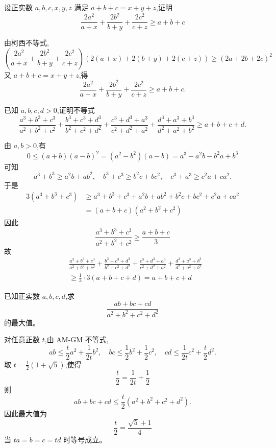 \begin{questions}
    \question 设正实数 $a,b,c,x,y,z$ 满足 $a+b+c = x+y+z$,证明
    \[
    \frac{2a^2}{a+x} + \frac{2b^2}{b+y} + \frac{2c^2}{c+z} \ge a+b+c
    \]
    \begin{solution}
    由柯西不等式,
        \[
        \left(\frac{2a^2}{a+x} + \frac{2b^2}{b+y} + \frac{2c^2}{c+z}\right)\left(2(a+x) +2(b+y) +2(c+z) \right) \ge (2a+2b+2c)^2 
        \]
        又 $a+b+c = x+y+z$,得
        \[
        \frac{2a^2}{a+x} + \frac{2b^2}{b+y} + \frac{2c^2}{c+z} \ge a+b+c.
        \]
    \end{solution}

    \question 已知 $a,b,c,d>0$,证明不等式
    \[
    \frac{a^{3}+b^{3}+c^{3}}{a^{2}+b^{2}+c^{2}}+\frac{b^{3}+c^{3}+d^{3}}{b^{2}+c^{2}+d^{2}}+\frac{c^{3}+d^{3}+a^{3}}{c^{2}+d^{2}+a^{2}}+\frac{d^{3}+a^{3}+b^{3}}{d^{2}+a^{2}+b^{2}}\ge a+b+c+d.
    \]
    \begin{solution}
        由 $a,b>0$,有
        \[
        0\le (a+b)(a-b)^2= (a^2-b^2)(a-b) = a^3 - a^2 b - b^2 a + b^3 
        \]
        可知
        \[
        a^3 + b^3 \ge a^2 b + a b^2, \quad b^3 + c^3 \ge b^2 c + b c^2, \quad c^3 + a^3 \ge c^2 a + c a^2.
        \]
        于是
        \begin{align*}
        3(a^3 + b^3 + c^3) &\ge a^3 + b^3 + c^3+ a^2 b + a b^2 + b^2 c + b c^2 + c^2 a + c a^2\\
        &=(a+b+c)(a^2 + b^2 + c^2)
        \end{align*}
        因此
        \[
        \frac{a^3 + b^3 + c^3}{a^2 + b^2 + c^2} \ge \frac{a+b+c}{3}
        \]
        故
        \begin{align*}
        &\frac{a^{3}+b^{3}+c^{3}}{a^{2}+b^{2}+c^{2}}+\frac{b^{3}+c^{3}+d^{3}}{b^{2}+c^{2}+d^{2}}+\frac{c^{3}+d^{3}+a^{3}}{c^{2}+d^{2}+a^{2}}+\frac{d^{3}+a^{3}+b^{3}}{d^{2}+a^{2}+b^{2}} \\[1mm]
        &\ge \frac{1}{3} \cdot 3(a+b+c+d) = a+b+c+d 
        \end{align*}
    \end{solution}

    \question 已知正实数 $a, b, c, d$,求
    \[
    \frac{ab + bc + cd}{a^2 + b^2 + c^2 + d^2}
    \]
    的最大值。
    \begin{solution}
        对任意正数 $t$,由 AM-GM 不等式,
        \[
        ab \le \frac{t}{2} a^2 + \frac{1}{2t} b^2, \quad 
        bc \le \frac{1}{2} b^2 + \frac{1}{2} c^2, \quad
        cd \le \frac{1}{2t} c^2 + \frac{t}{2} d^2.
        \]
        取 $t = \frac{1}{2}(1+\sqrt{5})$,使得 
        \[
        \frac{t}{2} = \frac{1}{2t} + \frac{1}{2}
        \]
        则
        \[
        ab + bc + cd \le \frac{t}{2} (a^2 + b^2 + c^2 + d^2).
        \]
        因此最大值为
        \[
        \frac{t}{2} = \frac{\sqrt{5}+1}{4}
        \]
        当 $ta = b = c = td$ 时等号成立。
    \end{solution}


\end{questions}
